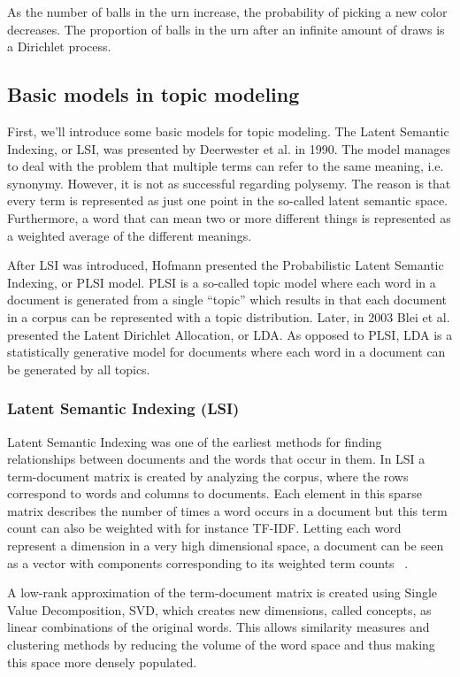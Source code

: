 \documentclass[12pt]{report}
\begin{document}
As the number of balls in the urn increase, the probability of picking a new
color decreases. The proportion of balls in the urn after an infinite amount of
draws is a Dirichlet process.


\subsection{Basic models in topic modeling}

First, we’ll introduce some basic models for topic modeling. The Latent Semantic
Indexing, or LSI, was presented by Deerwester et al. in 1990. The model manages
to deal with the problem that multiple terms can refer to the same meaning,
i.e. synonymy. However, it is not as successful regarding polysemy. The reason
is that every term is represented as just one point in the so-called latent
semantic space. Furthermore, a word that can mean two or more different things
is represented as a weighted average of the different meanings.
 
After LSI was introduced, Hofmann presented the Probabilistic Latent Semantic
Indexing, or PLSI model. PLSI is a so-called topic model where each word in a
document is generated from a single “topic” which results in that each document
in a corpus can be represented with a topic distribution. Later, in 2003 Blei et
al. presented the Latent Dirichlet Allocation, or LDA. As opposed to PLSI, LDA
is a statistically generative model for documents where each word in a document
can be generated by all topics.

\subsubsection{Latent Semantic Indexing (LSI)}

Latent Semantic Indexing was one of the earliest methods for finding
relationships between documents and the words that occur in them. In LSI a
term-document matrix is created by analyzing the corpus, where the rows
correspond to words and columns to documents. Each element in this sparse
matrix describes the number of times a word occurs in a document but this term
count can also be weighted with for instance TF-IDF. Letting each word
represent a dimension in a very high dimensional space, a document can be seen
as a vector with components corresponding to its weighted term counts ~\cite{Deerwester90indexingby}.

A low-rank approximation of the term-document matrix is created using Single
Value Decomposition, SVD, which creates new dimensions, called concepts, as
linear combinations of the original words. This allows similarity measures and
clustering methods by reducing the volume of the word space and thus making
this space more densely populated.
\end{document}
